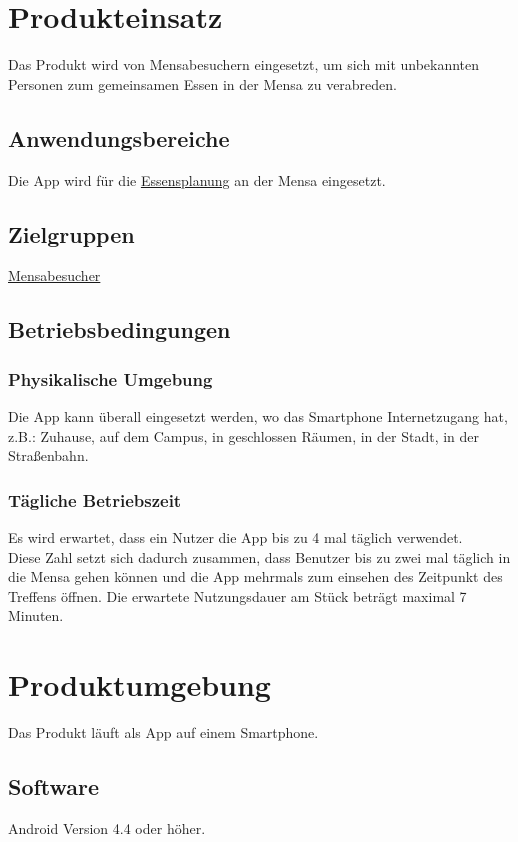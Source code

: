 \documentclass[a4paper]{scrreprt}
\begin{document}
\chapter{Produkteinsatz}
Das Produkt wird von Mensabesuchern eingesetzt, um sich mit unbekannten Personen zum gemeinsamen Essen in der Mensa zu verabreden.


\section{Anwendungsbereiche}
Die App wird für die \hyperlink{label3}{Essensplanung} an der Mensa eingesetzt.

\section{Zielgruppen}
\hyperlink{label1}{Mensabesucher}

\section{Betriebsbedingungen}
\subsection{Physikalische Umgebung}
Die App kann überall eingesetzt werden, wo das Smartphone Internetzugang hat,
z.B.: Zuhause, auf dem Campus, in geschlossen Räumen, in der Stadt, in der Straßenbahn.

\subsection{Tägliche Betriebszeit}
Es wird erwartet, dass ein Nutzer die App bis zu 4 mal täglich verwendet. \\
Diese Zahl setzt sich dadurch zusammen, dass Benutzer bis zu zwei mal täglich in die Mensa gehen können und die App mehrmals zum einsehen des Zeitpunkt des Treffens öffnen. Die erwartete Nutzungsdauer am Stück beträgt maximal 7 Minuten.

\chapter{Produktumgebung}
Das Produkt läuft als App auf einem Smartphone.

\section{Software}
Android Version 4.4 oder höher.
\end{document}
